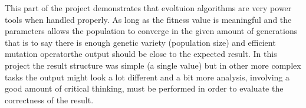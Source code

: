 This part of the project demonstrates that evoltuion algorithms are very power
tools when handled properly. As long as the fitness value is meaningful and the
parameters allows the population to converge in the given amount of generations
\textemdash that is to say there is enough genetic variety (population size)
and efficient mutation operator\textemdash the output
should be close to the expected result. In this project the result structure
was simple (a single value) but in other more complex tasks the output might
look a lot different and a bit more analysis, involving a good amount of
critical thinking, must be performed in order to evaluate the correctness of
the result.